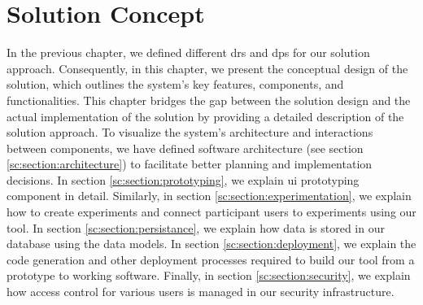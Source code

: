 
\chapter{Solution Concept}
\label{chap:concept}
\ifpdf
    \graphicspath{{Chapters/Solution-Concept/Figs/}{Chapters/Solution-Concept/Figs/}{Chapters/Solution-Concept/Figs/}}
\else
    \graphicspath{{Chapters/Solution-Concept/Figs/}{Chapters/Solution-Concept/Figs/}}
\fi
In the previous chapter, we defined different \ac{dr}s and \ac{dp}s for our solution approach. 
Consequently, in this chapter, we present the conceptual design of the solution, which outlines the system's key features, components, and functionalities. 
This chapter bridges the gap between the solution design and the actual implementation of the solution by providing a detailed description of the solution approach.
To visualize the system's architecture and interactions between components, we have defined software architecture (see section \ref{sc:section:architecture}) to facilitate better planning and implementation decisions.
In section \ref{sc:section:prototyping}, we explain \ac{ui} prototyping component in detail. 
Similarly, in section \ref{sc:section:experimentation}, we explain how to create experiments and connect participant users to experiments using our tool.
In section \ref{sc:section:persistance}, we explain how data is stored in our database using the data models. 
In section \ref{sc:section:deployment}, we explain the code generation and other deployment processes required to build our tool from a prototype to working software.
Finally, in section \ref{sc:section:security}, we explain how access control for various users is managed in our security infrastructure.


